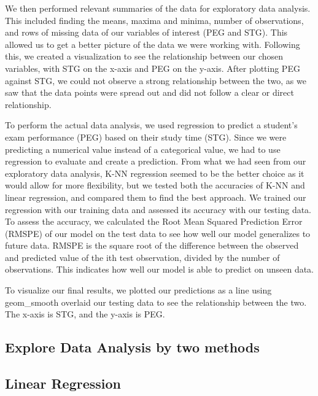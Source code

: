 \documentclass[
]{article}
\begin{document}
We then performed relevant summaries of the data for exploratory data analysis. This included finding the means, maxima and minima, number of observations, and rows of missing data of our variables of interest (PEG and STG). This allowed us to get a better picture of the data we were working with. Following this, we created a visualization to see the relationship between our chosen variables, with STG on the x-axis and PEG on the y-axis. After plotting PEG against STG, we could not observe a strong relationship between the two, as we saw that the data points were spread out and did not follow a clear or direct relationship.

To perform the actual data analysis, we used regression to predict a student's exam performance (PEG) based on their study time (STG). Since we were predicting a numerical value instead of a categorical value, we had to use regression to evaluate and create a prediction. From what we had seen from our exploratory data analysis, K-NN regression seemed to be the better choice as it would allow for more flexibility, but we tested both the accuracies of K-NN and linear regression, and compared them to find the best approach. We trained our regression with our training data and assessed its accuracy with our testing data. To assess the accuracy, we calculated the Root Mean Squared Prediction Error (RMSPE) of our model on the test data to see how well our model generalizes to future data. RMSPE is the square root of the difference between the observed and predicted value of the ith test observation, divided by the number of observations. This indicates how well our model is able to predict on unseen data.

To visualize our final results, we plotted our predictions as a line using geom\_smooth overlaid our testing data to see the relationship between the two. The x-axis is STG, and the y-axis is PEG.

\hypertarget{explore-data-analysis-by-two-methods}{%
\subsection{Explore Data Analysis by two methods}\label{explore-data-analysis-by-two-methods}}

\hypertarget{linear-regression}{%
\subsection{Linear Regression}\label{linear-regression}}
\end{document}
